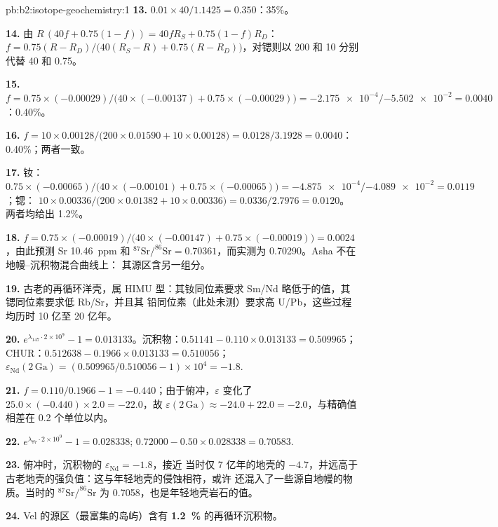\begin{solution}{pb:b2:isotope-geochemistry:1}
\textbf{13.} $0.01\times40/1.1425 = 0.350$：35\%。

\textbf{14.} 由 $R\,(40f + 0.75(1-f)) = 40fR_S + 0.75(1-f)R_D$：
$f = 0.75(R - R_D)/\bigl(40(R_S - R) + 0.75(R - R_D)\bigr)$，对锶则以 200
和 10 分别代替 40 和 0.75。

\textbf{15.} $f = 0.75\times(-0.00029)/\bigl(40\times(-0.00137) + 0.75\times(-0.00029)\bigr)
= \num{-2.175e-4}/\num{-5.502e-2} = 0.0040$：0.40\%。

\textbf{16.} $f = 10\times0.00128/\bigl(200\times0.01590 + 10\times0.00128\bigr) =
0.0128/3.1928 = 0.0040$：0.40\%；两者一致。

\textbf{17.} 钕：$0.75\times(-0.00065)/\bigl(40\times(-0.00101) +
0.75\times(-0.00065)\bigr) = \num{-4.875e-4}/\num{-4.089e-2} = 0.0119$；锶：
$10\times0.00336/\bigl(200\times0.01382 + 10\times0.00336\bigr) = 0.0336/2.7976 = 0.0120$。
两者均给出 1.2\%。

\textbf{18.} $f = 0.75\times(-0.00019)/\bigl(40\times(-0.00147) + 0.75\times(-0.00019)\bigr)
= 0.0024$，由此预测 Sr \qty{10.46}{ppm} 和 $^{87}\mathrm{Sr}/^{86}\mathrm{Sr} =
0.70361$，而实测为 0.70290。Asha 不在地幔–沉积物混合曲线上：
其源区含另一组分。

\textbf{19.} 古老的再循环洋壳，属 HIMU 型：其钕同位素要求 Sm/Nd
略低于的值，其锶同位素要求低 Rb/Sr，并且其
铅同位素（此处未测）要求高 U/Pb，这些过程均历时 10 亿至 20 亿年。

\textbf{20.} $e^{\lambda_{147}\cdot2\times10^9} - 1 = 0.013133$。沉积物：$0.51141 -
0.110\times0.013133 = 0.509965$；CHUR：$0.512638 - 0.1966\times0.013133 = 0.510056$；
$\varepsilon_{\mathrm{Nd}}(2\,\mathrm{Ga}) = (0.509965/0.510056 - 1)\times10^4 = -1.8$.

\textbf{21.} $f = 0.110/0.1966 - 1 = -0.440$；由于俯冲，$\varepsilon$ 变化了
$25.0\times(-0.440)\times2.0 = -22.0$，故 $\varepsilon(2\,\mathrm{Ga}) \approx -24.0 + 22.0
= -2.0$，与精确值相差在 0.2 个单位以内。

\textbf{22.} $e^{\lambda_{87}\cdot2\times10^9} - 1 = 0.028338$;
$0.72000 - 0.50\times0.028338 = 0.70583$.

\textbf{23.} 俯冲时，沉积物的 $\varepsilon_{\mathrm{Nd}} = -1.8$，接近
当时仅 7 亿年的地壳的 $-4.7$，并远高于
古老地壳的强负值：这与年轻地壳的侵蚀相符，或许
还混入了一些源自地幔的物质。当时的 $^{87}\mathrm{Sr}/^{86}\mathrm{Sr}$
为 0.7058，也是年轻地壳岩石的值。

\textbf{24.} Vel 的源区（最富集的岛屿）含有
\textbf{\qty[text-series-to-math=true]{1.2}{\percent}} 的再循环沉积物。
\end{solution}
